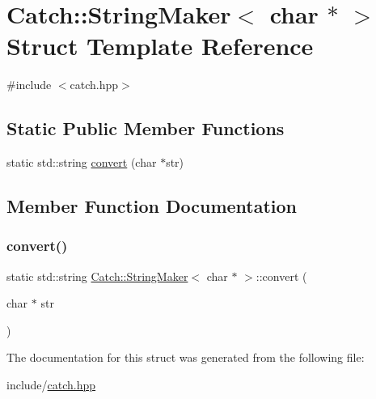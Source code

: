 \hypertarget{struct_catch_1_1_string_maker_3_01char_01_5_01_4}{}\section{Catch\+::String\+Maker$<$ char $\ast$ $>$ Struct Template Reference}
\label{struct_catch_1_1_string_maker_3_01char_01_5_01_4}


{\ttfamily \#include $<$catch.\+hpp$>$}

\subsection*{Static Public Member Functions}
\begin{DoxyCompactItemize}
\item 
static std\+::string \mbox{\hyperlink{struct_catch_1_1_string_maker_3_01char_01_5_01_4_a33049e24281ea6fba48bd8817bdd52bd}{convert}} (char $\ast$str)
\end{DoxyCompactItemize}


\subsection{Member Function Documentation}
\mbox{\label{struct_catch_1_1_string_maker_3_01char_01_5_01_4_a33049e24281ea6fba48bd8817bdd52bd}} 
\subsubsection{\texorpdfstring{convert()}{convert()}}
{\footnotesize\ttfamily static std\+::string \mbox{\hyperlink{struct_catch_1_1_string_maker}{Catch\+::\+String\+Maker}}$<$ char $\ast$ $>$\+::convert (\begin{DoxyParamCaption}\item[{char $\ast$}]{str }\end{DoxyParamCaption})\hspace{0.3cm}{\ttfamily [static]}}



The documentation for this struct was generated from the following file\+:\begin{DoxyCompactItemize}
\item 
include/\mbox{\hyperlink{catch_8hpp}{catch.\+hpp}}\end{DoxyCompactItemize}
